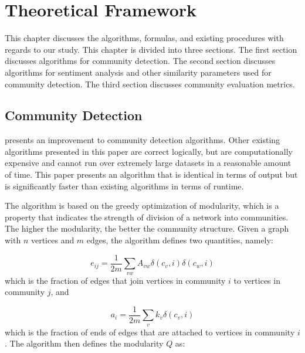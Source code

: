 %
%
%                 

\chapter{Theoretical Framework}
\label{sec:theoframe}

This chapter discusses the algorithms, formulas, and existing procedures with regards to our study. This chapter is divided into three sections. The first section discusses algorithms for community detection. The second section discusses algorithms for sentiment analysis and other similarity parameters used for community detection. The third section discusses community evaluation metrics.

\section{Community Detection}

 presents an improvement to community detection algorithms. Other existing algorithms presented in this paper are correct logically, but are computationally expensive and cannot run over extremely large datasets in a reasonable amount of time. This paper presents an algorithm that is identical in terms of output but is significantly faster than existing algorithms in terms of runtime.

The algorithm is based on the greedy optimization of modularity, which is a property that indicates the strength of division of a network into communities. The higher the modularity, the better the community structure. Given a graph with $n$ vertices and $m$ edges, the algorithm defines two quantities, namely:

\begin{equation}
e_{ij} = \frac{1}{2m} \sum_{vw}{A_{vw}\delta(c_v,i)\delta(c_w,i)}
\end{equation}which is the fraction of edges that join vertices in community $i$ to vertices in community $j$, and

\begin{equation}
a_i = \frac{1}{2m} \sum_{v}{k_v\delta(c_v,i)}
\end{equation}which is the fraction of ends of edges that are attached to vertices in community $i$. The algorithm then defines the modularity $Q$ as:

